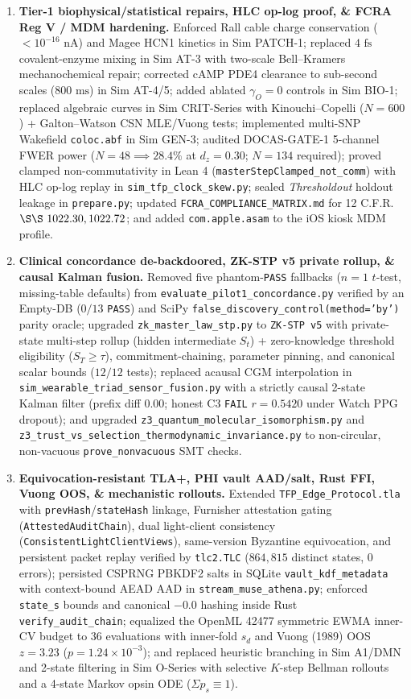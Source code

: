 \documentclass[11pt]{article}
\begin{document}
\begin{enumerate}
\item \textbf{Tier-1 biophysical/statistical repairs, HLC op-log proof, \& FCRA Reg V / MDM hardening.} Enforced Rall cable charge conservation ($< 10^{-16}\text{ nA}$) and Magee HCN1 kinetics in Sim PATCH-1; replaced $4\text{ fs}$ covalent-enzyme mixing in Sim AT-3 with two-scale Bell--Kramers mechanochemical repair; corrected cAMP PDE4 clearance to sub-second scales ($800\text{ ms}$) in Sim AT-4/5; added ablated $\gamma_O=0$ controls in Sim BIO-1; replaced algebraic curves in Sim CRIT-Series with Kinouchi--Copelli ($N=600$) + Galton--Watson CSN MLE/Vuong tests; implemented multi-SNP Wakefield \texttt{coloc.abf} in Sim GEN-3; audited DOCAS-GATE-1 5-channel FWER power ($N=48 \implies 28.4\%$ at $d_z=0.30$; $N=134$ required); proved clamped non-commutativity in Lean 4 (\texttt{masterStepClamped\_not\_comm}) with HLC op-log replay in \texttt{sim\_tfp\_clock\_skew.py}; sealed \emph{Thresholdout} holdout leakage in \texttt{prepare.py}; updated \texttt{FCRA\_COMPLIANCE\_MATRIX.md} for 12 C.F.R.\ $\S\S~1022.30, 1022.72$; and added \texttt{com.apple.asam} to the iOS kiosk MDM profile.
\item \textbf{Clinical concordance de-backdoored, ZK-STP v5 private rollup, \& causal Kalman fusion.} Removed five phantom-\texttt{PASS} fallbacks ($n=1$ $t$-test, missing-table defaults) from \texttt{evaluate\_pilot1\_concordance.py} verified by an Empty-DB ($0/13$ \texttt{PASS}) and SciPy \texttt{false\_discovery\_control(method='by')} parity oracle; upgraded \texttt{zk\_master\_law\_stp.py} to \texttt{ZK-STP v5} with private-state multi-step rollup (hidden intermediate $S_t$) + zero-knowledge threshold eligibility ($S_T \ge \tau$), commitment-chaining, parameter pinning, and canonical scalar bounds ($12/12$ tests); replaced acausal CGM interpolation in \texttt{sim\_wearable\_triad\_sensor\_fusion.py} with a strictly causal 2-state Kalman filter (prefix diff $0.00$; honest C3 \texttt{FAIL} $r=0.5420$ under Watch PPG dropout); and upgraded \texttt{z3\_quantum\_molecular\_isomorphism.py} and \texttt{z3\_trust\_vs\_selection\_thermodynamic\_invariance.py} to non-circular, non-vacuous \texttt{prove\_nonvacuous} SMT checks.
\item \textbf{Equivocation-resistant TLA+, PHI vault AAD/salt, Rust FFI, Vuong OOS, \& mechanistic rollouts.} Extended \texttt{TFP\_Edge\_Protocol.tla} with \texttt{prevHash}/\texttt{stateHash} linkage, Furnisher attestation gating (\texttt{AttestedAuditChain}), dual light-client consistency (\texttt{ConsistentLightClientViews}), same-version Byzantine equivocation, and persistent packet replay verified by \texttt{tlc2.TLC} ($864{,}815$ distinct states, $0$ errors); persisted CSPRNG PBKDF2 salts in SQLite \texttt{vault\_kdf\_metadata} with context-bound AEAD AAD in \texttt{stream\_muse\_athena.py}; enforced \texttt{state\_s} bounds and canonical $-0.0$ hashing inside Rust \texttt{verify\_audit\_chain}; equalized the OpenML 42477 symmetric EWMA inner-CV budget to $36$ evaluations with inner-fold $s_d$ and Vuong (1989) OOS $z = 3.23$ ($p = 1.24 \times 10^{-3}$); and replaced heuristic branching in Sim A1/DMN and 2-state filtering in Sim O-Series with selective $K$-step Bellman rollouts and a 4-state Markov opsin ODE ($\Sigma p_s \equiv 1$).

\end{enumerate}
\end{document}
